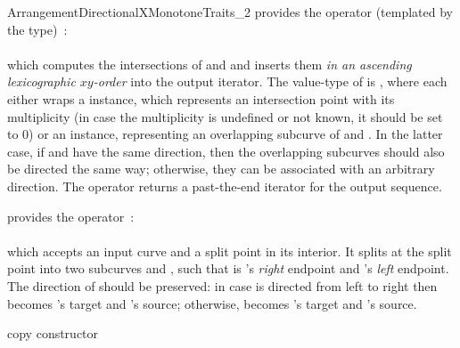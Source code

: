 \begin{ccRefConcept}{ArrangementDirectionalXMonotoneTraits_2}
{provides the operator (templated by the  type)~: \\
  \\
 which computes the intersections of  and  and inserts them
 {\sl in an ascending lexicographic $xy$-order} into the output iterator.
 The value-type of  is , where each
  either wraps a  instance, which
 represents an intersection point with its multiplicity (in case the
 multiplicity is undefined or not known, it should be set to $0$) or an
  instance, representing an overlapping subcurve of
  and . In the latter case, if  and  have the
 same direction, then the overlapping subcurves should also be directed the
 same way; otherwise, they can be associated with an arbitrary direction.
 The operator returns a past-the-end iterator for the output sequence.}

{provides the operator~: \\
  \\
 which accepts an input curve  and a split point  in its
 interior. It splits  at the split point into two subcurves 
 and , such that  is 's {\sl right} endpoint and
 's {\sl left} endpoint. The direction of  should be preserved:
 in case  is directed from left to right then  becomes 's
 target and 's source; otherwise,  becomes 's
 target and 's source.} 

\ccCreation
{}

\ccThreeToTwo

\ccGlue
{}
{copy constructor}
\ccGlue
{}




\end{ccRefConcept}
